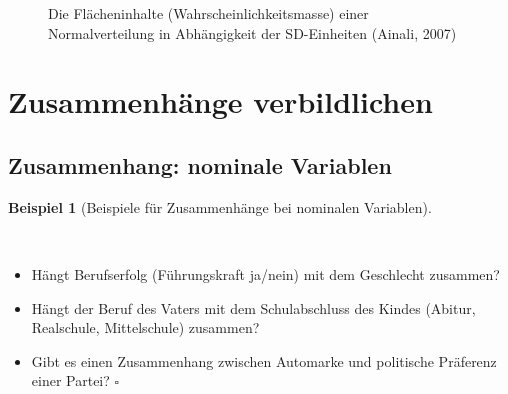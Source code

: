 \documentclass[
  letterpaper,
]{scrbook}
\providecommand{\tightlist}{%
  \setlength{\itemsep}{0pt}\setlength{\parskip}{0pt}}\usepackage{longtable,booktabs,array}
\theoremstyle{definition}
\theoremstyle{definition}
\newtheorem{example}{Beispiel}[chapter]
\theoremstyle{definition}
\theoremstyle{remark}
\begin{document}
\begin{figure}


\caption{\label{fig-norm-perc}Die Flächeninhalte
(Wahrscheinlichkeitsmasse) einer Normalverteilung in Abhängigkeit der
SD-Einheiten (Ainali, 2007)}

\end{figure}%

\section{Zusammenhänge
verbildlichen}\label{zusammenhuxe4nge-verbildlichen}

\subsection{Zusammenhang: nominale
Variablen}\label{zusammenhang-nominale-variablen}

\begin{example}[Beispiele für Zusammenhänge bei nominalen
Variablen]\protect\hypertarget{exm-nom-zshg}{}\label{exm-nom-zshg}

~

\begin{itemize}
\tightlist
\item
  Hängt Berufserfolg (Führungskraft ja/nein) mit dem Geschlecht
  zusammen?
\item
  Hängt der Beruf des Vaters mit dem Schulabschluss des Kindes (Abitur,
  Realschule, Mittelschule) zusammen?
\item
  Gibt es einen Zusammenhang zwischen Automarke und politische Präferenz
  einer Partei? \(\square\)
\end{itemize}

\end{example}
\end{document}
